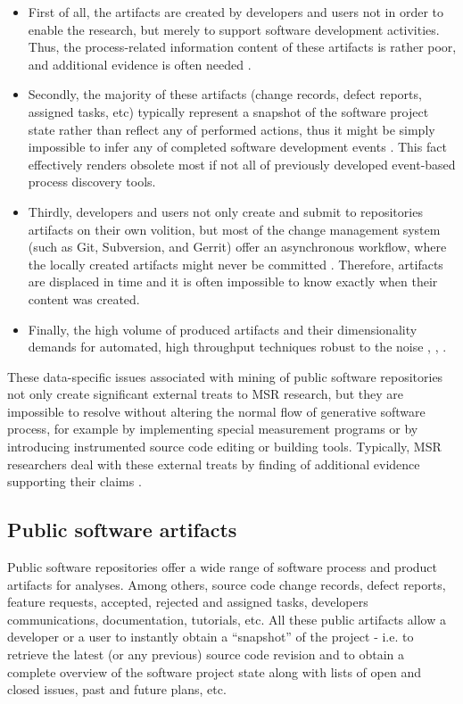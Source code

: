 \begin{itemize}
 \item First of all, the artifacts are created by developers and users not in order to enable the research,
but merely to support software development activities. Thus, the process-related information content of these
artifacts is rather poor, and additional evidence is often needed \cite{citeulike:342840} \cite{citeulike:7954249} 
\cite{citeulike:7260421}.
 \item Secondly, the majority of these artifacts (change records, defect reports, assigned tasks, etc) 
typically represent a snapshot of the software project state rather than reflect any of performed actions, 
thus it might be simply impossible to infer any of completed software development events \cite{citeulike:1296888}.
This fact effectively renders obsolete most if not all of previously developed event-based process discovery tools.
 \item Thirdly, developers and users not only create and submit to repositories artifacts on their own volition,
but most of the change management system (such as Git, Subversion, and Gerrit) offer an asynchronous workflow, 
where the locally created artifacts might never be committed \cite{citeulike:2280690} \cite{citeulike:9037939}. 
Therefore, artifacts are displaced in time and it is often impossible to know exactly when their content was created.
 \item Finally, the high volume of produced artifacts and their dimensionality demands for automated, high throughput 
techniques robust to the noise \cite{citeulike:12550438}, \cite{citeulike:7853299}, \cite{citeulike:4534888}.
\end{itemize}

These data-specific issues associated with mining of public software repositories not only create significant external treats 
to MSR research, but they are impossible to resolve without altering the normal flow of generative software process, 
for example by implementing special measurement programs or by introducing instrumented source code editing or building tools. 
Typically, MSR researchers deal with these external treats by finding of additional evidence supporting their 
claims \cite{citeulike:5043664} \cite{citeulike:5128808}.

\subsection{Public software artifacts}
Public software repositories offer a wide range of software process and product artifacts for analyses.
Among others, source code change records, defect reports, feature requests, accepted, rejected and assigned tasks, 
developers communications, documentation, tutorials, etc. 
All these public artifacts allow a developer or a user to instantly obtain a ``snapshot'' of the project - 
i.e. to retrieve the latest (or any previous) source code revision and to obtain a complete overview of the software 
project state along with lists of open and closed issues, past and future plans, etc.

